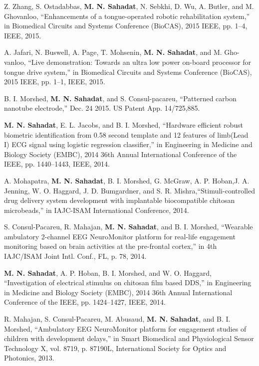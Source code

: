 \begin{cvitems}
\item{Z. Zhang, S. Ostadabbas, \textbf{M. N. Sahadat}, N. Sebkhi, D. Wu, A. Butler, and M. Ghovanloo, “Enhancements of a tongue-operated robotic rehabilitation system,” in Biomedical  Circuits  and  Systems  Conference  (BioCAS),  2015 IEEE, pp. 1–4, IEEE, 2015.}
\item{A. Jafari, N. Buswell, A. Page, T. Mohsenin, \textbf{M. N. Sahadat}, and M. Gho-vanloo,  “Live demonstration:  Towards an ultra low power on-board processor for tongue drive system,” in Biomedical Circuits and Systems Conference (BioCAS), 2015 IEEE, pp. 1–1, IEEE, 2015.}
\item{B. I. Morshed, \textbf{M. N. Sahadat}, and S. Consul-pacareu, “Patterned carbon nanotube electrode,” Dec. 24 2015.  US Patent App. 14/725,885.}
\item{\textbf{M. N. Sahadat}, E. L. Jacobs, and B. I. Morshed, “Hardware efficient robust biometric identification from 0.58 second template and 12 features of limb(Lead  I)  ECG  signal  using  logistic  regression  classifier,”  in Engineering  in Medicine  and  Biology  Society  (EMBC),  2014  36th  Annual  International Conference of the IEEE, pp. 1440–1443, IEEE, 2014.}
\item{A. Mohapatra, \textbf{M. N. Sahadat}, B. I. Morshed, G. McGraw, A. P. Hoban,J.  A.  Jenning,  W.  O.  Haggard,  J.  D.  Bumgardner,  and  S.  R.  Mishra,“Stimuli-controlled  drug  delivery system  development  with  implantable biocompatible chitosan microbeads,” in IAJC-ISAM International Conference, 2014.}
\item{S. Consul-Pacareu, R. Mahajan, \textbf{M. N. Sahadat}, and B. I. Morshed, “Wearable ambulatory 2-channel EEG NeuroMonitor platform for real-life engagement monitoring based on brain activities at the pre-frontal cortex,” in 4th IAJC/ISAM Joint Intl. Conf., FL, p. 78, 2014.}
\item{ \textbf{M. N. Sahadat}, A. P. Hoban, B. I. Morshed, and W. O. Haggard, “Investigation of electrical stimulus on chitosan film based DDS,” in Engineering in Medicine and Biology Society (EMBC), 2014 36th Annual International Conference of the IEEE, pp. 1424–1427, IEEE, 2014.}
\item{R.  Mahajan,  S.  Consul-Pacareu,  M.  Abusaud,  \textbf{M. N. Sahadat},  and  B.  I. Morshed, “Ambulatory EEG NeuroMonitor platform for engagement studies of children with development delays,” in Smart Biomedical and Physiological  Sensor  Technology  X, vol. 8719,  p. 87190L, International Society for Optics and Photonics, 2013.}

\end{cvitems}
